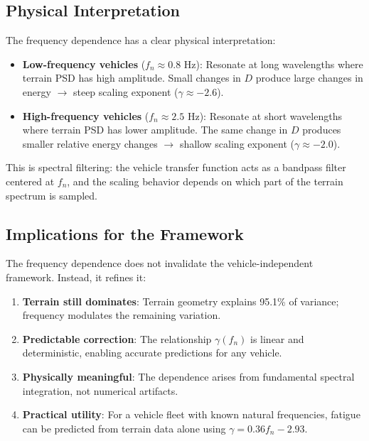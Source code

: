 \documentclass[11pt,letterpaper]{article}
\begin{document}
\subsection{Physical Interpretation}

The frequency dependence has a clear physical interpretation:

\begin{itemize}
\item \textbf{Low-frequency vehicles} ($f_n \approx 0.8$ Hz): Resonate at long wavelengths where terrain PSD has high amplitude. Small changes in $D$ produce large changes in energy $\rightarrow$ steep scaling exponent ($\gamma \approx -2.6$).

\item \textbf{High-frequency vehicles} ($f_n \approx 2.5$ Hz): Resonate at short wavelengths where terrain PSD has lower amplitude. The same change in $D$ produces smaller relative energy changes $\rightarrow$ shallow scaling exponent ($\gamma \approx -2.0$).
\end{itemize}

This is spectral filtering: the vehicle transfer function acts as a bandpass filter centered at $f_n$, and the scaling behavior depends on which part of the terrain spectrum is sampled.

\subsection{Implications for the Framework}

The frequency dependence does not invalidate the vehicle-independent framework. Instead, it refines it:

\begin{enumerate}
\item \textbf{Terrain still dominates}: Terrain geometry explains 95.1\% of variance; frequency modulates the remaining variation.

\item \textbf{Predictable correction}: The relationship $\gamma(f_n)$ is linear and deterministic, enabling accurate predictions for any vehicle.

\item \textbf{Physically meaningful}: The dependence arises from fundamental spectral integration, not numerical artifacts.

\item \textbf{Practical utility}: For a vehicle fleet with known natural frequencies, fatigue can be predicted from terrain data alone using $\gamma = 0.36 f_n - 2.93$.
\end{enumerate}
\end{document}
